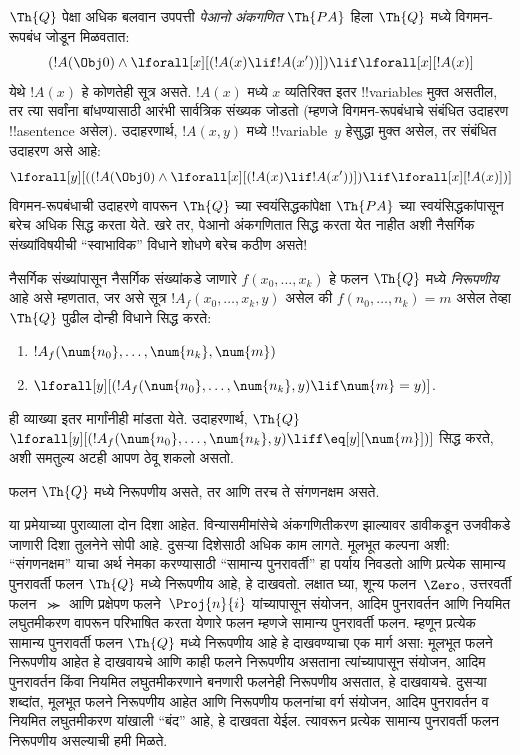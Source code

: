 \documentclass[../../../include/open-logic-section]{subfiles}
\begin{document}
$\Th{Q}$ पेक्षा अधिक बलवान उपपत्ती \emph{पेआनो अंकगणित}
$\Th{PA}$ हिला $\Th{Q}$ मध्ये विगमन-रूपबंध जोडून मिळवतात:
\[
(!A(\Obj 0) \land \lforall[x][(!A(x) \lif !A(x'))]) \lif \lforall[x][!A(x)]
\]
येथे $!A(x)$ हे कोणतेही सूत्र असते. $!A(x)$ मध्ये $x$ व्यतिरिक्त
इतर !!{variable}s मुक्त असतील, तर त्या सर्वांना बांधण्यासाठी
आरंभी सार्वत्रिक संख्यक जोडतो (म्हणजे विगमन-रूपबंधाचे संबंधित
उदाहरण !!a{sentence} असेल). उदाहरणार्थ, $!A(x, y)$ मध्ये
!!{variable}~$y$ हेसुद्धा मुक्त असेल, तर संबंधित उदाहरण असे आहे:
\[
\lforall[y][((!A(\Obj 0) \land \lforall[x][(!A(x) \lif !A(x'))]) \lif
  \lforall[x][!A(x)])]
\]
विगमन-रूपबंधाची उदाहरणे वापरून $\Th{Q}$ च्या स्वयंसिद्धकांपेक्षा
$\Th{PA}$ च्या स्वयंसिद्धकांपासून बरेच अधिक सिद्ध करता येते.
खरे तर, पेआनो अंकगणितात सिद्ध करता येत नाहीत अशी नैसर्गिक
संख्यांविषयीची ``स्वाभाविक'' विधाने शोधणे बरेच कठीण असते!{}

\begin{defn}
  नैसर्गिक संख्यांपासून नैसर्गिक संख्यांकडे जाणारे
  $f(x_0,\ldots,x_k)$ हे फलन $\Th{Q}$ मध्ये
  {\em निरूपणीय} आहे असे म्हणतात, जर असे सूत्र
  $!A_f(x_0,\dots,x_k,y)$ असेल की
  $f(n_0,\dots,n_k) = m$ असेल तेव्हा $\Th{Q}$ पुढील दोन्ही
  विधाने सिद्ध करते:
\begin{enumerate}
\item{} $!A_f(\num{n_0}, \dots, \num{n_k}, \num{m})$
\item{} $\lforall[y][(!A_f(\num{n_0}, \dots,
\num{n_k}, y) \lif \num{m} = y)]$.
\end{enumerate}
\end{defn}

ही व्याख्या इतर मार्गांनीही मांडता येते. उदाहरणार्थ, $\Th{Q}$
$\lforall[y][(!A_f(\num{n_0}, \dots,
\num{n_k}, y) \liff \eq[y][\num{m}])]$ सिद्ध करते, अशी
समतुल्य अटही आपण ठेवू शकलो असतो.

\begin{thm}
फलन $\Th{Q}$ मध्ये निरूपणीय असते, तर आणि तरच ते संगणनक्षम असते.
\end{thm}

या प्रमेयाच्या पुराव्याला दोन दिशा आहेत. विन्यासमीमांसेचे अंकगणितीकरण
झाल्यावर डावीकडून उजवीकडे जाणारी दिशा तुलनेने सोपी आहे. दुसऱ्या
दिशेसाठी अधिक काम लागते. मूलभूत कल्पना अशी: ``संगणनक्षम'' याचा
अर्थ नेमका करण्यासाठी ``सामान्य पुनरावर्ती'' हा पर्याय निवडतो आणि
प्रत्येक सामान्य पुनरावर्ती फलन $\Th{Q}$ मध्ये निरूपणीय आहे,
हे दाखवतो. लक्षात घ्या, शून्य फलन~$\Zero$, उत्तरवर्ती फलन~$\Succ$
आणि प्रक्षेपण फलने~$\Proj{n}{i}$ यांच्यापासून संयोजन, आदिम पुनरावर्तन
आणि नियमित लघुतमीकरण वापरून परिभाषित करता येणारे फलन म्हणजे
सामान्य पुनरावर्ती फलन. म्हणून प्रत्येक सामान्य पुनरावर्ती फलन
$\Th{Q}$ मध्ये निरूपणीय आहे हे दाखवण्याचा एक मार्ग असा: मूलभूत
फलने निरूपणीय आहेत हे दाखवायचे आणि काही फलने निरूपणीय असताना
त्यांच्यापासून संयोजन, आदिम पुनरावर्तन किंवा नियमित लघुतमीकरणाने
बनणारी फलनेही निरूपणीय असतात, हे दाखवायचे. दुसऱ्या शब्दांत,
मूलभूत फलने निरूपणीय आहेत आणि निरूपणीय फलनांचा वर्ग संयोजन,
आदिम पुनरावर्तन व नियमित लघुतमीकरण यांखाली ``बंद'' आहे,
हे दाखवता येईल. त्यावरून प्रत्येक सामान्य पुनरावर्ती फलन
निरूपणीय असल्याची हमी मिळते.
\end{document}
